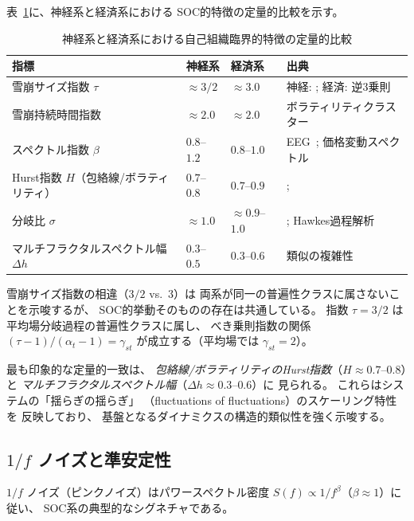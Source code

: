 \documentclass[12pt,twocolumn]{ltjsarticle}
\begin{document}
表~\ref{tab:soc}に、神経系と経済系における
SOC的特徴の定量的比較を示す。

\begin{table}[t]
\centering
\caption{神経系と経済系における自己組織臨界的特徴の定量的比較}
\label{tab:soc}
\begin{tabular}{lllp{5.5cm}}
\toprule
\textbf{指標} & \textbf{神経系} & \textbf{経済系} & \textbf{出典} \\
\midrule
雪崩サイズ指数 $\tau$ & $\approx 3/2$ & $\approx 3.0$ &
  神経: \cite{Beggs2003}; 経済: 逆3乗則~\cite{Gabaix2003} \\
雪崩持続時間指数 & $\approx 2.0$ & $\approx 2.0$ &
  ボラティリティクラスター~\cite{Cont2001} \\
スペクトル指数 $\beta$ & $0.8$--$1.2$ & $0.8$--$1.0$ &
  EEG~\cite{He2010}; 価格変動スペクトル \\
Hurst指数 $H$（包絡線/ボラティリティ） & $0.7$--$0.8$ & $0.7$--$0.9$ &
  \cite{Linkenkaer2001}; \cite{Cont2001} \\
分岐比 $\sigma$ & $\approx 1.0$ & $\approx 0.9$--$1.0$ &
  \cite{Beggs2003}; Hawkes過程解析~\cite{Hardiman2013} \\
マルチフラクタルスペクトル幅 $\Delta h$ & $0.3$--$0.5$ & $0.3$--$0.6$ &
  類似の複雑性 \\
\bottomrule
\end{tabular}
\end{table}

雪崩サイズ指数の相違（$3/2$ vs.\ $3$）は
両系が同一の普遍性クラスに属さないことを示唆するが、
SOC的挙動そのものの存在は共通している。
指数 $\tau = 3/2$ は平均場分岐過程の普遍性クラスに属し、
べき乗則指数の関係 $(\tau - 1)/(\alpha_t - 1) = \gamma_{st}$
が成立する（平均場では $\gamma_{st} = 2$）。

最も印象的な定量的一致は、
\emph{包絡線/ボラティリティのHurst指数}（$H \approx 0.7$--$0.8$）と
\emph{マルチフラクタルスペクトル幅}（$\Delta h \approx 0.3$--$0.6$）に
見られる。
これらはシステムの「揺らぎの揺らぎ」
（fluctuations of fluctuations）のスケーリング特性を
反映しており、
基盤となるダイナミクスの構造的類似性を強く示唆する。

\subsection{$1/f$ ノイズと準安定性}

$1/f$ ノイズ（ピンクノイズ）はパワースペクトル密度
$S(f) \propto 1/f^\beta$（$\beta \approx 1$）に従い、
SOC系の典型的なシグネチャである。
\end{document}
